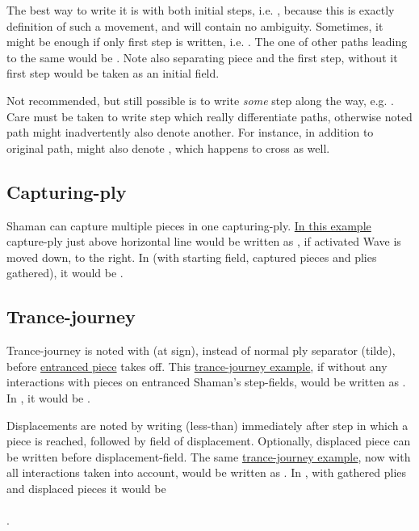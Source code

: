 The best way to write it is with both initial steps, i.e. , because
this is exactly definition of such a movement, and will contain no ambiguity. Sometimes,
it might be enough if only first step is written, i.e. . The one of other
paths leading to the same  would be . Note also 
separating piece and the first step, without it first step would be taken as an initial
field.

Not recommended, but still possible is to write \emph{some} step along the way, e.g.
. Care must be taken to write step which really differentiate paths,
otherwise noted path might inadvertently also denote another. For instance, in addition
to original path,  might also denote , which happens
to cross  as well.

\subsection*{Capturing-ply}
\label{sec:Appendix/Notation/Capturing-ply}

Shaman can capture multiple pieces in one capturing-ply.
\hyperref[fig:scn_cot_03_light_shaman_capture_ply]{In this example} capture-ply just above
horizontal line would be written as , if activated Wave is moved
down, to the right. In  (with starting field, captured pieces and plies gathered),
it would be \alg{[Hd9.h10*P.l11*P.p12]\~{}[Wn8]}.

\subsection*{Trance-journey}
\label{sec:Appendix/Notation/Trance-journey}

Trance-journey is noted with  (at sign), instead of normal ply separator \alg{\~{}}
(tilde), before \hyperref[fig:scn_o_22_light_starchild_init_trance_journey]{entranced piece} takes
off. This \hyperref[fig:scn_cot_18_light_light_shaman_interaction_start]{trance-journey example},
if without any interactions with pieces on entranced Shaman's step-fields, would be written
as . In , it would be .

Displacements are noted by writing \alg{<} (less-than) immediately after step in which a
piece is reached, followed by field of displacement. Optionally, displaced piece can be
written before displacement-field. The same
\hyperref[fig:scn_cot_19_light_light_shaman_interaction_end]{trance-journey example},
now with all interactions taken into account, would be written as
. In , with gathered plies and
displaced pieces it would be \\
\\
\alg{[He13..e18<Ni14..m12<Pj17..g24]}.

